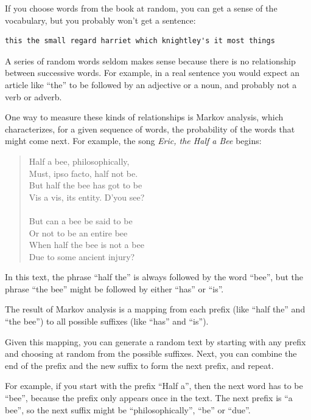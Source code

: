 \documentclass[10pt]{book}
\begin{document}
If you choose words from the book at random, you can get a
sense of the vocabulary, but you probably won't get a sentence:

\begin{verbatim}
this the small regard harriet which knightley's it most things
\end{verbatim}
%
A series of random words seldom makes sense because there
is no relationship between successive words.  For example, in
a real sentence you would expect an article like ``the'' to
be followed by an adjective or a noun, and probably not a verb
or adverb.

One way to measure these kinds of relationships is Markov
analysis, which
characterizes, for a given sequence of words, the probability of the
words that might come next.  For example, the song {\em Eric, the Half a
  Bee} begins:

\begin{quote}
Half a bee, philosophically, \\
Must, ipso facto, half not be. \\
But half the bee has got to be \\
Vis a vis, its entity. D'you see? \\
\\
But can a bee be said to be \\
Or not to be an entire bee \\
When half the bee is not a bee \\
Due to some ancient injury? \\
\end{quote}
%
In this text,
the phrase ``half the'' is always followed by the word ``bee'',
but the phrase ``the bee'' might be followed by either
``has'' or ``is''.

The result of Markov analysis is a mapping from each prefix
(like ``half the'' and ``the bee'') to all possible suffixes
(like ``has'' and ``is'').

Given this mapping, you can generate a random text by
starting with any prefix and choosing at random from the
possible suffixes.  Next, you can combine the end of the
prefix and the new suffix to form the next prefix, and repeat.

For example, if you start with the prefix ``Half a'', then the
next word has to be ``bee'', because the prefix only appears
once in the text.  The next prefix is ``a bee'', so the
next suffix might be ``philosophically'', ``be'' or ``due''.
\end{document}
